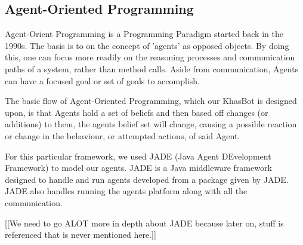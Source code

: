 \documentclass[letterpaper]{article}
\begin{document}
\subsection{Agent-Oriented Programming}
Agent-Orient Programming is a Programming Paradigm started back in the 1990s.  The basis is to on the concept of 'agents' as opposed objects.  By doing this, one can focus more readily on the reasoning processes and communication paths of a system, rather than method calls\cite{AOP}.  Aside from communication, Agents can have a focused goal or set of goals to accomplish.

The basic flow of Agent-Oriented Programming, which our KhasBot is designed upon, is that Agents hold a set of beliefs and then based off changes (or additions) to them, the agents belief set will change, causing a possible reaction or change in the behaviour, or attempted actions, of said Agent.

For this particular framework, we used JADE (Java Agent DEvelopment Framework) to model our agents.  JADE is a Java middleware framework designed to handle and run agents developed from a package given by JADE.  JADE also handles running the agents platform along with all the communication\cite{JADEbook}.

[[We need to go ALOT more in depth about JADE because later on, stuff is referenced that is never mentioned here.]]
\end{document}
